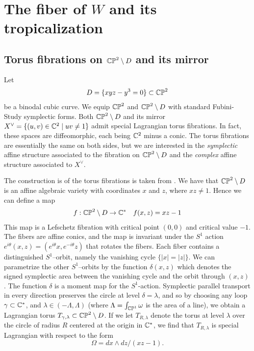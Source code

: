 \documentclass[12pt]{amsart}
\begin{document}
\section{The fiber of $W$ and its tropicalization}
\label{sec:fiber-superpotential}

\subsection{Torus fibrations on $\mathbb{CP}^2 \setminus D$ and its mirror}
\label{sec:torus-fibrations}

Let 
\begin{equation}
D = \{xyz-y^3 = 0\} \subset \mathbb{CP}^2  
\end{equation}
 be a binodal cubic
curve. We equip $\mathbb{CP}^2$ and $\mathbb{CP}^2 \setminus D$ with standard Fubini-Study symplectic forms. Both $\mathbb{CP}^2 \setminus D$ and its mirror $X^\vee = \{(u,v)\in
\mathbb{C}^2\mid uv \neq 1\}$ admit special Lagrangian torus fibrations. In
fact, these spaces are diffeomorphic, each being $\mathbb{C}^2$ minus a
conic. The torus fibrations are essentially the same on both sides,
but we are interested in the \emph{symplectic} affine structure
associated to the fibration on $\mathbb{CP}^2 \setminus D$ and the
\emph{complex} affine structure associated to $X^\vee$.

The construction is of the torus fibrations is taken from \cite[\S
5]{auroux07}. We have that
$\mathbb{CP}^2\setminus D$ is an affine algebraic variety with coordinates $x$
and $z$, where $xz\neq 1$. Hence we can define a map 
\begin{equation}
f: \mathbb{CP}^2\setminus D \to \mathbb{C}^* \quad f(x,z) = xz-1
\end{equation}
This map is a Lefschetz
fibration with critical point $(0,0)$ and critical value $-1$. The
fibers are affine conics, and the map is invariant under the $S^1$
action $e^{i\theta}(x,z) = (e^{i\theta}x,e^{-i\theta}z)$ that rotates
the fibers. Each fiber contains a distinguished $S^1$--orbit, namely
the vanishing cycle $\{|x| = |z|\}$. We can parametrize the other
$S^1$--orbits by the function $\delta(x,z)$ which denotes the signed
symplectic area between the vanishing cycle and the orbit through
$(x,z)$. The function $\delta$ is a moment map for the
$S^1$-action. Symplectic parallel transport in every direction
preserves the circle at level $\delta = \lambda$, and so by choosing
any loop $\gamma \subset \mathbb{C}^*$, and $\lambda \in (-\Lambda,\Lambda)$
(where $\Lambda = \int_{\mathbb{CP}^1} \omega$ is the area of a line), we
obtain a Lagrangian torus $T_{\gamma,\lambda} \subset \mathbb{CP}^2 \setminus
D$. If we let $T_{R,\lambda}$ denote the torus at level $\lambda$ over
the circle of radius $R$ centered at the origin in $\mathbb{C}^*$, we find
that $T_{R,\lambda}$ is special Lagrangian with respect to the form
\begin{equation}
\Omega = dx\wedge dz/(xz-1).
\end{equation}
\end{document}
